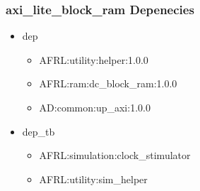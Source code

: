 \subsubsection{axi\_lite\_block\_ram Depenecies}
\begin{itemize}
\item dep
	\begin{itemize}
	\item AFRL:utility:helper:1.0.0
	\item AFRL:ram:dc\_block\_ram:1.0.0
	\item AD:common:up\_axi:1.0.0
	\end{itemize}
\item dep\_tb
	\begin{itemize}
	\item AFRL:simulation:clock\_stimulator
	\item AFRL:utility:sim\_helper
	\end{itemize}
\end{itemize}
